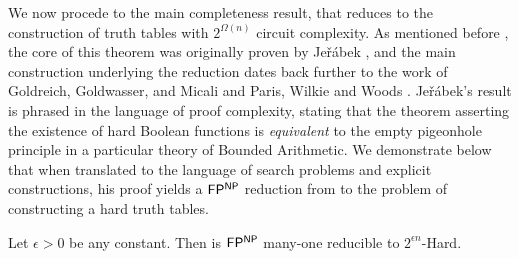 We now procede to the main completeness result, that \avoid reduces to the construction of truth tables with $2^{\Omega(n)}$ circuit complexity. As mentioned before , the core of this theorem was originally proven by Je\v{r}\'{a}bek \cite{Jerabek}, and the main construction underlying the reduction dates back further to the work of Goldreich, Goldwasser, and Micali \cite{GGM} and Paris, Wilkie and Woods \cite{Paris-Wilkie-Woods}.  Je\v{r}\'{a}bek's result is phrased in the language of proof complexity, stating that the theorem asserting the existence of hard Boolean functions is \emph{equivalent} to the empty pigeonhole principle in a particular theory of Bounded Arithmetic. We demonstrate below that when translated to the language of search problems and explicit constructions, his proof yields a $\cl{FP^{NP}}$ reduction from \avoid to the problem of constructing a hard truth tables.
\begin{theorem}\label{thm:epsilon-hard-reduction}
Let $\epsilon > 0$ be any constant. Then \avoid is $\cl{FP^{NP}}$ many-one reducible to {\sc $2^{\epsilon n}$-Hard}.
\end{theorem}

